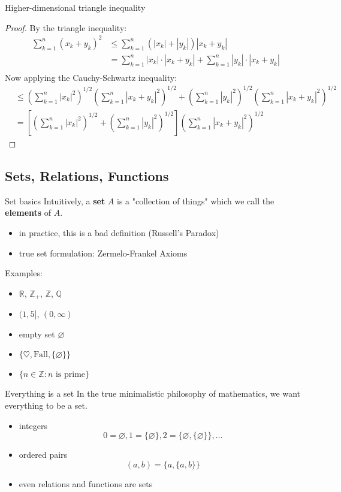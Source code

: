 \documentclass{beamer}
\begin{document}
\begin{frame}{Higher-dimensional triangle inequality}
\begin{proof}
By the triangle inequality:
{\tiny
\begin{align*}
\sum_{k=1}^n (x_k+y_k)^2
  & \leq \sum_{k=1}^n (|x_k|+|y_k|)|x_k+y_k|\\
  & =    \sum_{k=1}^n |x_k|\cdot|x_k+y_k| + \sum_{k=1}^n |y_k|\cdot|x_k+y_k|\\
\end{align*}
}
Now applying the Cauchy-Schwartz inequality: 
{\tiny
\begin{align*}
  & \leq \left(\sum_{k=1}^n |x_k|^2\right)^{1/2}\left(\sum_{k=1}^n |x_k+y_k|^2\right)^{1/2}  +  \left(\sum_{k=1}^n |y_k|^2\right)^{1/2}\left(\sum_{k=1}^n |x_k+y_k|^2\right)^{1/2}\\
  & = \left[\left(\sum_{k=1}^n |x_k|^2\right)^{1/2}  +  \left(\sum_{k=1}^n |y_k|^2\right)^{1/2}\right] \left(\sum_{k=1}^n |x_k+y_k|^2\right)^{1/2}
\end{align*}
}
\end{proof}
\end{frame}

\subsection{Sets, Relations, Functions}

\begin{frame}{Set basics}
Intuitively, a \textbf{set} $A$ is a "collection of things" which we call the \textbf{elements} of $A$.
\begin{itemize}
\item in practice, this is a bad definition (Russell's Paradox)
\item true set formulation: Zermelo-Frankel Axioms
\end{itemize}
Examples:
\begin{itemize}
\item $\mathbb R$, $\mathbb{Z}_+$, $\mathbb{Z}$, $\mathbb{Q}$
\item $(1,5]$, $(0,\infty)$
\item empty set $\varnothing$
\item $\{\heartsuit,\text{Fall}, \{\varnothing\}\}$
\item $\{n\in \mathbb{Z}: \text{$n$ is prime}\}$
\end{itemize}
\end{frame}

\begin{frame}{Everything is a set}
In the true minimalistic philosophy of mathematics, we want everything to be a set.
\begin{itemize}
\item integers
$$0 = \varnothing, 1 = \{\varnothing\}, 2 = \{\varnothing,\{\varnothing\}\},\dots$$
\item ordered pairs
$$(a,b) = \{a,\{a,b\}\}$$
\item even relations and functions are sets
\end{itemize}
\end{frame}
\end{document}

